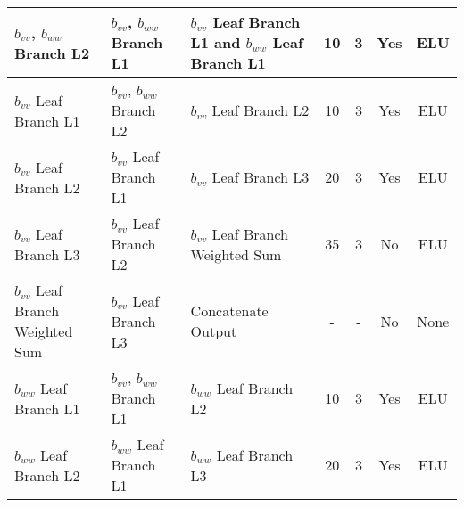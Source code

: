 \documentclass[11pt]{article}
\numberwithin{equation}{section}
\theoremstyle{plain}
\theoremstyle{definition}
\begin{document}
\begin{sidewaystable}[]
{\begin{tabular}{lllcccc}
$b_{vv}$, $b_{ww}$ Branch L2               & $b_{vv}$, $b_{ww}$ Branch L1                                         & $b_{vv}$ Leaf Branch L1 and $b_{ww}$ Leaf Branch L1                   & 10                                     & 3                                            & Yes                                      & ELU                                      \\ \midrule
$b_{vv}$ Leaf Branch L1                      & $b_{vv}$, $b_{ww}$ Branch L2                                         & $b_{vv}$ Leaf Branch L2                                            & 10                                     & 3                                            & Yes                                      & ELU                                      \\ 
$b_{vv}$ Leaf Branch L2                      & $b_{vv}$ Leaf Branch L1                                                & $b_{vv}$ Leaf Branch L3                                            & 20                                     & 3                                            & Yes                                      & ELU                                      \\ 
$b_{vv}$ Leaf Branch L3                      & $b_{vv}$ Leaf Branch L2                                                & $b_{vv}$ Leaf Branch Weighted Sum                                       & 35                                     & 3                                            & No                                       & ELU                                      \\ 
$b_{vv}$ Leaf Branch Weighted Sum                        & $b_{vv}$ Leaf Branch L3                                                & Concatenate Output                                              & -                                      & -                                            & No                                       & None                                     \\ \midrule
$b_{ww}$ Leaf Branch L1                      & $b_{vv}$, $b_{ww}$ Branch L1                                         & $b_{ww}$ Leaf Branch L2                                            & 10                                     & 3                                            & Yes                                      & ELU                                      \\ 
$b_{ww}$ Leaf Branch L2                      & $b_{ww}$ Leaf Branch L1                                                & $b_{ww}$ Leaf Branch L3                                            & 20                                     & 3                                            & Yes                                      & ELU                                      \\ 

\end{tabular}}
\end{sidewaystable}
\end{document}
